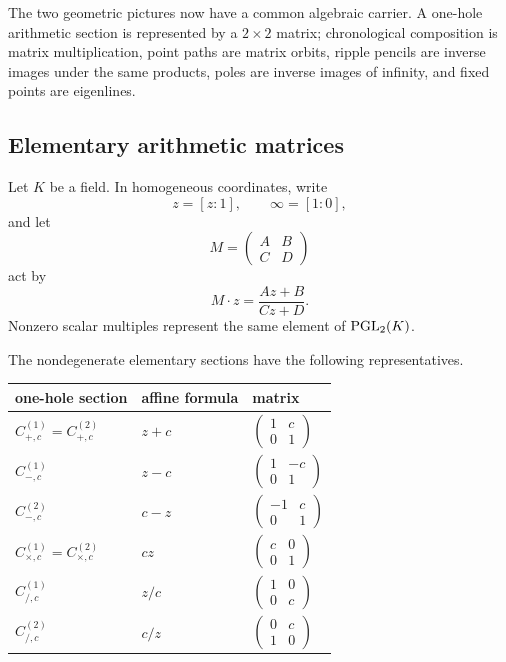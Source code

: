 The two geometric pictures now have a common algebraic carrier.  A one-hole
arithmetic section is represented by a $2\times2$ matrix; chronological
composition is matrix multiplication, point paths are matrix orbits, ripple
pencils are inverse images under the same products, poles are inverse images
of infinity, and fixed points are eigenlines.

\subsection{Elementary arithmetic matrices}

Let $K$ be a field.  In homogeneous coordinates, write
\[
  z=[z:1],
  \qquad
  \infty=[1:0],
\]
and let
\[
  M=\begin{pmatrix}A&B\\C&D\end{pmatrix}
\]
act by
\[
  M\cdot z=\frac{Az+B}{Cz+D}.
\]
Nonzero scalar multiples represent the same element of $\operatorname{PGL}_2(K)$.

The nondegenerate elementary sections have the following representatives.

\begin{center}
\renewcommand{\arraystretch}{1.4}
\begin{tabular}{lll}
\toprule
one-hole section & affine formula & matrix \\
\midrule
$C^{(1)}_{+,c}=C^{(2)}_{+,c}$
& $z+c$
& $\begin{pmatrix}1&c\\0&1\end{pmatrix}$ \\
$C^{(1)}_{-,c}$
& $z-c$
& $\begin{pmatrix}1&-c\\0&1\end{pmatrix}$ \\
$C^{(2)}_{-,c}$
& $c-z$
& $\begin{pmatrix}-1&c\\0&1\end{pmatrix}$ \\
$C^{(1)}_{\times,c}=C^{(2)}_{\times,c}$
& $cz$
& $\begin{pmatrix}c&0\\0&1\end{pmatrix}$ \\
$C^{(1)}_{/,c}$
& $z/c$
& $\begin{pmatrix}1&0\\0&c\end{pmatrix}$ \\
$C^{(2)}_{/,c}$
& $c/z$
& $\begin{pmatrix}0&c\\1&0\end{pmatrix}$ \\
\bottomrule
\end{tabular}
\end{center}

